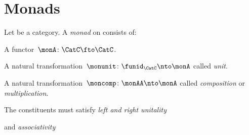 

\section{Monads}
\label{sec:monads}

\begin{ctdefinition}[Monad]
  \label{def:monad}
  Let \CatC be a category. A \emph{monad} on \CatC consists of:
  \begin{compactenum}
    \item A functor~$ \monA \colon \CatC \fto \CatC$.
    \item A natural transformation~$\monunit \colon \funid_\CatC \nto \monA$ called \emph{unit}.
    \item A natural transformation~$\moncomp \colon \monAA \nto \monA$ called \emph{composition} or \emph{multiplication}.
  \end{compactenum}
  The constituents must satisfy \emph{left and right unitality}
  \begin{center}
  \end{center}
  and \emph{associativity}
  \begin{center}
  \end{center}
\end{ctdefinition}



\begin{exercise}
\end{exercise}
\begin{solution}
\end{solution}
